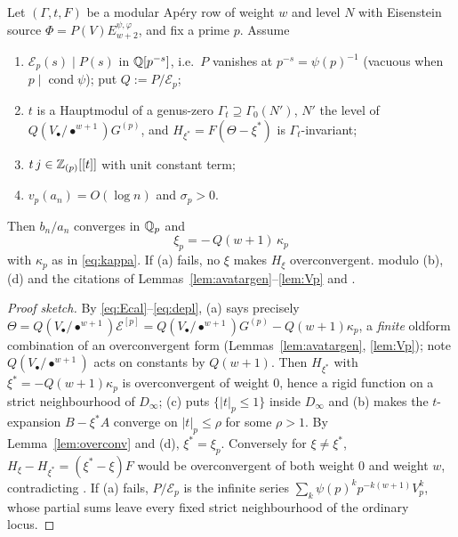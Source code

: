 \begin{namedthm}\label{thm:F}
Let $(\Gamma,t,F)$ be a modular Ap\'ery row of weight $w$ and level $N$ with
Eisenstein source $\Phi=P(V)E^{\psi,\varphi}_{w+2}$, and fix a prime $p$.
Assume
\begin{enumerate}[label=\textup{(\alph*)}]
\item $\mathcal E_p(s)\mid P(s)$ in $\mathbb{Q}[p^{-s}]$, i.e.\ $P$ vanishes at
$p^{-s}=\psi(p)^{-1}$ \textup{(}vacuous when $p\mid\operatorname{cond}\psi$\textup{)};
put $Q:=P/\mathcal E_p$;
\item $t$ is a Hauptmodul of a genus-zero $\Gamma_t\supseteq\Gamma_0(N')$,
$N'$ the level of $Q(V_\bullet/\bullet^{w+1})G^{(p)}$, and
$H_{\xi^*}=F(\Theta-\xi^*)$ is $\Gamma_t$-invariant;
\item $t\,j\in\mathbb{Z}_{(p)}[[t]]$ with unit constant term;
\item $v_p(a_n)=O(\log n)$ and $\sigma_p>0$.
\end{enumerate}
Then $b_n/a_n$ converges in $\mathbb{Q}_p$ and
\begin{equation}\label{eq:xivalue}
\boxed{\ \xi_p=-\,Q(w+1)\,\kappa_p\ }
\end{equation}
with $\kappa_p$ as in \eqref{eq:kappa}.  If \textup{(a)} fails, no $\xi$ makes
$H_\xi$ overconvergent.  \Proved{} modulo \textup{(b)}, \textup{(d)} and the
citations of Lemmas~\ref{lem:avatargen}--\ref{lem:Vp} and
\cite[4.4.2]{Katz1973}.
\end{namedthm}

\begin{proof}[Proof sketch]
By \eqref{eq:Ecal}--\eqref{eq:depl}, (a) says precisely
$\Theta=Q(V_\bullet/\bullet^{w+1})\mathcal E^{[p]}
 =Q(V_\bullet/\bullet^{w+1})G^{(p)}-Q(w+1)\kappa_p$, a \emph{finite} oldform
combination of an overconvergent form (Lemmas~\ref{lem:avatargen},
\ref{lem:Vp}); note $Q(V_\bullet/\bullet^{w+1})$ acts on constants by
$Q(w+1)$.  Then $H_{\xi^*}$ with $\xi^*=-Q(w+1)\kappa_p$ is overconvergent of
weight $0$, hence a rigid function on a strict neighbourhood of $D_\infty$;
(c) puts $\{|t|_p\le1\}$ inside $D_\infty$ and (b) makes the $t$-expansion
$B-\xi^*A$ converge on $|t|_p\le\rho$ for some $\rho>1$.  By
Lemma~\ref{lem:overconv} and (d), $\xi^*=\xi_p$.  Conversely for
$\xi\ne\xi^*$, $H_\xi-H_{\xi^*}=(\xi^*-\xi)F$ would be overconvergent of both
weight $0$ and weight $w$, contradicting \cite[4.4.2]{Katz1973}.  If (a)
fails, $P/\mathcal E_p$ is the infinite series
$\sum_k\psi(p)^kp^{-k(w+1)}V_p^k$, whose partial sums leave every fixed strict
neighbourhood of the ordinary locus.
\end{proof}

